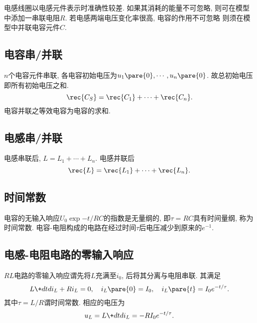 \documentclass{ctexart}
\begin{document}
电感线圈以电感元件表示时准确性较差. 如果其消耗的能量不可忽略, 则可在模型中添加一串联电阻$R$. 若电感两端电压变化率很高, 电容的作用不可忽略 则须在模型中并联电容元件$C$.


\subsection{电容串/并联} %
\label{sub:电容串并联}

$n$个电容元件串联, 各电容初始电压为$u_1\pare{0}, \cdots, u_n\pare{0}$. 故总初始电压即所有初始电压之和.
\[ \rec{C_S} = \rec{C_1} + \cdots + \rec{C_n}. \]
电容并联之等效电容为电容的求和.


\subsection{电感串/并联} %
\label{sub:电感串并联}

电感串联后, $L = L_1 + \cdots + L_n$. 电感并联后
\[ \rec{L} = \rec{L_1} + \cdots + \rec{L_n}. \]


\subsection{时间常数} %
\label{sub:时间常数}

电容的无输入响应$U_0 \exp{-t/RC}$的指数是无量纲的, 即$\tau = RC$具有时间量纲, 称为时间常数. 电容-电阻构成的电路在经过时间$\tau$后电压减少到原来的$e^{-1}$.


\subsection{电感-电阻电路的零输入响应} %
\label{sub:电感_电阻电路的零输入响应}

$RL$电路的零输入响应谓先将$L$充满至$i_0$, 后将其分离与电阻串联. 其满足
\[ L\+dtd{i_L} + Ri_L = 0, \quad i_L\pare{0} = I_0,\quad i_L\pare{t} = I_0 e^{-t/\tau}. \]
其中$\tau = L/R$谓时间常数. 相应的电压为
\[ u_L = L\+dtd{i_L} = -RI_0 e^{-t/\tau}. \]
\end{document}
